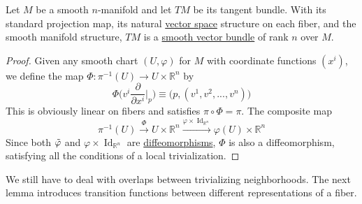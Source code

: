 \documentclass{article}
\DeclareMathOperator{\Id}{Id}
\newcounter{theorem}[section]
\begin{document}
  \begin{theorem}
    \label{thm:the-tangent-bundle-as-a-vector-bundle}
  Let $M$ be a smooth $n$-manifold and let $TM$ be its tangent bundle. With its standard projection map, its natural \hyperref[lin-def:vector-space]{vector space} structure on each fiber, and the smooth manifold structure, $TM$ is a \hyperref[def:smooth-vector-bundle]{smooth vector bundle} of rank $n$ over $M$. 
  \end{theorem}
  \begin{proof}
  Given any smooth chart $(U, \varphi)$ for $M$ with coordinate functions $(x^i)$, we define the map $\Phi: \pi^{-1} (U) \to U \times \mathbb{R}^n$ by 
  \begin{equation}
    \Phi \bigg( v^i \frac{\partial}{\partial x^i} \bigg|_p \bigg) \equiv \big( p, (v^1, v^2, ..., v^n)\big)
  \end{equation}
  This is obviously linear on fibers and satisfies $\pi \circ \Phi = \pi$. The composite map 
  \begin{equation}
    \pi^{-1} (U) \xrightarrow{\Phi} U \times \mathbb{R}^n \xrightarrow{\varphi \times \Id_{\mathbb{R}^n}} \varphi(U) \times \mathbb{R}^n
  \end{equation}
  Since both $\Tilde{\varphi}$ and $\varphi \times \Id_{\mathbb{R}^n}$ are \hyperref[def:diffeomorphism-2]{diffeomorphisms}, $\Phi$ is also a diffeomorphism, satisfying all the conditions of a local trivialization. 
  \end{proof}

  We still have to deal with overlaps between trivializing neighborhoods. The next lemma introduces transition functions between different representations of a fiber. 
\end{document}
